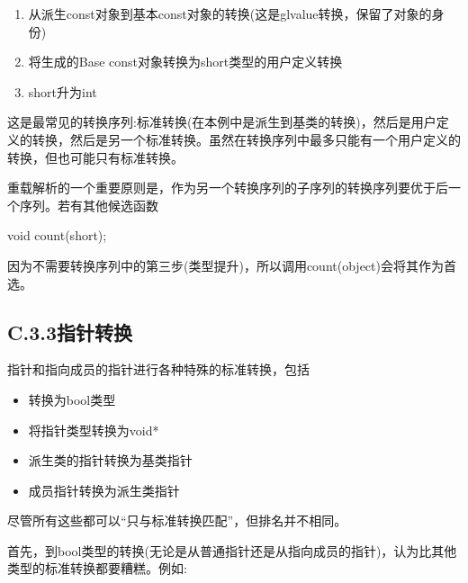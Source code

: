 \begin{enumerate}
\item 
从派生const对象到基本const对象的转换(这是glvalue转换，保留了对象的身份)

\item 
将生成的Base const对象转换为short类型的用户定义转换

\item 
short升为int
\end{enumerate}

这是最常见的转换序列:标准转换(在本例中是派生到基类的转换)，然后是用户定义的转换，然后是另一个标准转换。虽然在转换序列中最多只能有一个用户定义的转换，但也可能只有标准转换。

重载解析的一个重要原则是，作为另一个转换序列的子序列的转换序列要优于后一个序列。若有其他候选函数

\begin{cpp}
void count(short);
\end{cpp}

因为不需要转换序列中的第三步(类型提升)，所以调用count(object)会将其作为首选。

\subsection{C.3.3\hspace{0.2cm}指针转换}

指针和指向成员的指针进行各种特殊的标准转换，包括

\begin{itemize}
\item 
转换为bool类型

\item 
将指针类型转换为void*

\item 
派生类的指针转换为基类指针

\item 
成员指针转换为派生类指针
\end{itemize}

尽管所有这些都可以“只与标准转换匹配”，但排名并不相同。

首先，到bool类型的转换(无论是从普通指针还是从指向成员的指针)，认为比其他类型的标准转换都要糟糕。例如:


